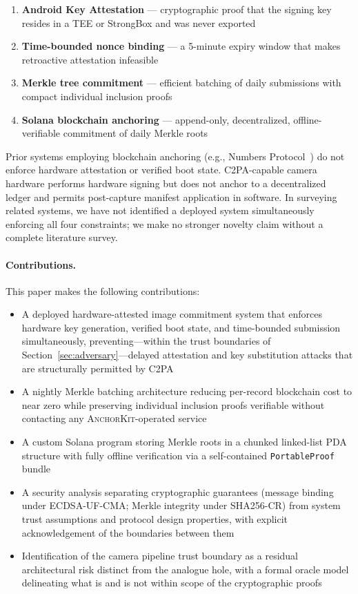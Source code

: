 \documentclass[11pt,a4paper]{article}
\newcommand{\AK}{\textsc{AnchorKit}\xspace}
\begin{document}
\begin{enumerate}[label=\arabic*.]
  \item \textbf{Android Key Attestation} --- cryptographic proof that the
    signing key resides in a TEE or StrongBox and was never exported
  \item \textbf{Time-bounded nonce binding} --- a 5-minute expiry window that
    makes retroactive attestation infeasible
  \item \textbf{Merkle tree commitment} --- efficient batching of daily
    submissions with compact individual inclusion proofs
  \item \textbf{Solana blockchain anchoring} --- append-only, decentralized,
    offline-verifiable commitment of daily Merkle roots
\end{enumerate}

Prior systems employing blockchain anchoring (e.g., Numbers
Protocol~\cite{numbers22}) do not enforce hardware attestation or verified boot
state.  C2PA-capable camera hardware performs hardware signing but does not
anchor to a decentralized ledger and permits post-capture manifest application
in software.  In surveying related systems, we have not identified a deployed
system simultaneously enforcing all four constraints; we make no stronger
novelty claim without a complete literature survey.

\paragraph{Contributions.} This paper makes the following contributions:

\begin{itemize}
  \item A deployed hardware-attested image commitment system that enforces
    hardware key generation, verified boot state, and time-bounded submission
    simultaneously, preventing---within the trust boundaries of
    Section~\ref{sec:adversary}---delayed attestation and key substitution
    attacks that are structurally permitted by C2PA
  \item A nightly Merkle batching architecture reducing per-record blockchain
    cost to near zero while preserving individual inclusion proofs verifiable
    without contacting any \AK-operated service
  \item A custom Solana program storing Merkle roots in a chunked linked-list
    PDA structure with fully offline verification via a self-contained
    \texttt{PortableProof} bundle
  \item A security analysis separating cryptographic guarantees (message
    binding under ECDSA-UF-CMA; Merkle integrity under SHA256-CR) from system
    trust assumptions and protocol design properties, with explicit
    acknowledgement of the boundaries between them
  \item Identification of the camera pipeline trust boundary as a residual
    architectural risk distinct from the analogue hole, with a formal oracle
    model delineating what is and is not within scope of the cryptographic
    proofs
\end{itemize}
\end{document}

